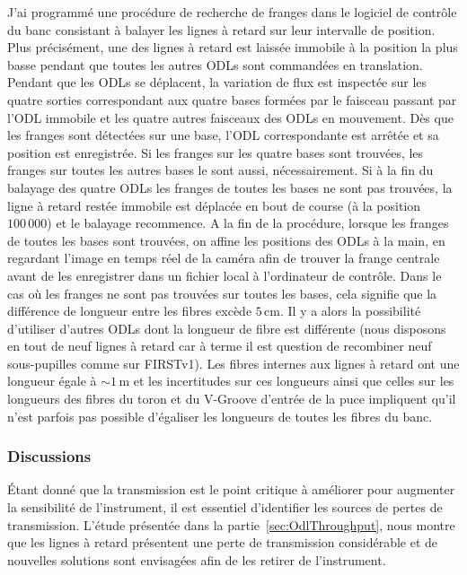 J'ai programmé une procédure de recherche de franges dans le logiciel de contrôle du banc consistant à balayer les lignes à retard sur leur intervalle de position. Plus précisément, une des lignes à retard est laissée immobile à la position la plus basse pendant que toutes les autres \ac{ODL}s sont commandées en translation. Pendant que les \ac{ODL}s se déplacent, la variation de flux est inspectée sur les quatre sorties correspondant aux quatre bases formées par le faisceau passant par l'\ac{ODL} immobile et les quatre autres faisceaux des \ac{ODL}s en mouvement. Dès que les franges sont détectées sur une base, l'\ac{ODL} correspondante est arrêtée et sa position est enregistrée. Si les franges sur les quatre bases sont trouvées, les franges sur toutes les autres bases le sont aussi, nécessairement. Si à la fin du balayage des quatre \ac{ODL}s les franges de toutes les bases ne sont pas trouvées, la ligne à retard restée immobile est déplacée en bout de course (à la position $100\,000$) et le balayage recommence. A la fin de la procédure, lorsque les franges de toutes les bases sont trouvées, on affine les positions des \ac{ODL}s à la main, en regardant l'image en temps réel de la caméra afin de trouver la frange centrale avant de les enregistrer dans un fichier local à l'ordinateur de contrôle. Dans le cas où les franges ne sont pas trouvées sur toutes les bases, cela signifie que la différence de longueur entre les fibres excède $5 \,$cm. Il y a alors la possibilité d'utiliser d'autres \ac{ODL}s dont la longueur de fibre est différente (nous disposons en tout de neuf lignes à retard car à terme il est question de recombiner neuf sous-pupilles comme sur \ac{FIRSTv1}). Les fibres internes aux lignes à retard ont une longueur égale à $\sim 1 \,$m et les incertitudes sur ces longueurs ainsi que celles sur les longueurs des fibres du toron et du V-Groove d'entrée de la puce impliquent qu'il n'est parfois pas possible d'égaliser les longueurs de toutes les fibres du banc.


\subsubsection{Discussions}
\label{sec:ODLDiscussions}

Étant donné que la transmission est le point critique à améliorer pour augmenter la sensibilité de l'instrument, il est essentiel d'identifier les sources de pertes de transmission. L'étude présentée dans la partie~\ref{sec:OdlThroughput}, nous montre que les lignes à retard présentent une perte de transmission considérable et de nouvelles solutions sont envisagées afin de les retirer de l'instrument.

